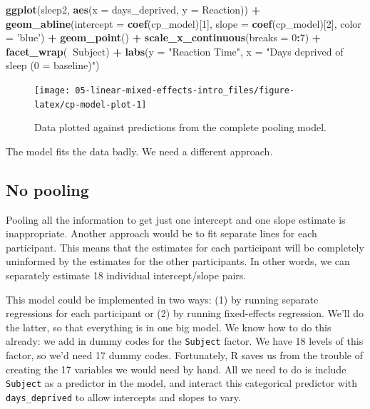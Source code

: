 \documentclass[]{book}
\newenvironment{Shaded}{\begin{snugshade}}{\end{snugshade}}
\newcommand{\DataTypeTok}[1]{\textcolor[rgb]{0.13,0.29,0.53}{#1}}
\newcommand{\DecValTok}[1]{\textcolor[rgb]{0.00,0.00,0.81}{#1}}
\newcommand{\KeywordTok}[1]{\textcolor[rgb]{0.13,0.29,0.53}{\textbf{#1}}}
\newcommand{\NormalTok}[1]{#1}
\newcommand{\OperatorTok}[1]{\textcolor[rgb]{0.81,0.36,0.00}{\textbf{#1}}}
\newcommand{\StringTok}[1]{\textcolor[rgb]{0.31,0.60,0.02}{#1}}
\begin{document}
\begin{Shaded}
\begin{Highlighting}[]
\KeywordTok{ggplot}\NormalTok{(sleep2, }\KeywordTok{aes}\NormalTok{(}\DataTypeTok{x =}\NormalTok{ days_deprived, }\DataTypeTok{y =}\NormalTok{ Reaction)) }\OperatorTok{+}
\StringTok{  }\KeywordTok{geom_abline}\NormalTok{(}\DataTypeTok{intercept =} \KeywordTok{coef}\NormalTok{(cp_model)[}\DecValTok{1}\NormalTok{],}
              \DataTypeTok{slope =} \KeywordTok{coef}\NormalTok{(cp_model)[}\DecValTok{2}\NormalTok{],}
              \DataTypeTok{color =} \StringTok{'blue'}\NormalTok{) }\OperatorTok{+}
\StringTok{  }\KeywordTok{geom_point}\NormalTok{() }\OperatorTok{+}
\StringTok{  }\KeywordTok{scale_x_continuous}\NormalTok{(}\DataTypeTok{breaks =} \DecValTok{0}\OperatorTok{:}\DecValTok{7}\NormalTok{) }\OperatorTok{+}
\StringTok{  }\KeywordTok{facet_wrap}\NormalTok{(}\OperatorTok{~}\NormalTok{Subject) }\OperatorTok{+}
\StringTok{  }\KeywordTok{labs}\NormalTok{(}\DataTypeTok{y =} \StringTok{"Reaction Time"}\NormalTok{, }\DataTypeTok{x =} \StringTok{"Days deprived of sleep (0 = baseline)"}\NormalTok{)}
\end{Highlighting}
\end{Shaded}

\begin{figure}

{\centering \texttt{[image: 05-linear-mixed-effects-intro\_files/figure-latex/cp-model-plot-1]} 

}

\caption{Data plotted against predictions from the complete pooling model.}\label{fig:cp-model-plot}
\end{figure}

The model fits the data badly. We need a different approach.

\hypertarget{no-pooling}{%
\subsection{No pooling}\label{no-pooling}}

Pooling all the information to get just one intercept and one slope estimate is inappropriate. Another approach would be to fit separate lines for each participant. This means that the estimates for each participant will be completely uninformed by the estimates for the other participants. In other words, we can separately estimate 18 individual intercept/slope pairs.

This model could be implemented in two ways: (1) by running separate regressions for each participant or (2) by running fixed-effects regression. We'll do the latter, so that everything is in one big model. We know how to do this already: we add in dummy codes for the \texttt{Subject} factor. We have 18 levels of this factor, so we'd need 17 dummy codes. Fortunately, R saves us from the trouble of creating the 17 variables we would need by hand. All we need to do is include \texttt{Subject} as a predictor in the model, and interact this categorical predictor with \texttt{days\_deprived} to allow intercepts and slopes to vary.
\end{document}
